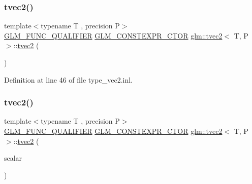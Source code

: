 \mbox{\label{structglm_1_1tvec2_a8874fb6a6421887e236bd3fae0fb44b2}} 
\subsubsection{\texorpdfstring{tvec2()}{tvec2()}\hspace{0.1cm}{\footnotesize\ttfamily [4/17]}}
{\footnotesize\ttfamily template$<$typename T , precision P$>$ \\
\mbox{\hyperlink{setup_8hpp_a33fdea6f91c5f834105f7415e2a64407}{G\+L\+M\+\_\+\+F\+U\+N\+C\+\_\+\+Q\+U\+A\+L\+I\+F\+I\+ER}} \mbox{\hyperlink{setup_8hpp_ad34178a09666081abdb573c14d1f4a5a}{G\+L\+M\+\_\+\+C\+O\+N\+S\+T\+E\+X\+P\+R\+\_\+\+C\+T\+OR}} \mbox{\hyperlink{structglm_1_1tvec2}{glm\+::tvec2}}$<$ T, P $>$\+::\mbox{\hyperlink{structglm_1_1tvec2}{tvec2}} (\begin{DoxyParamCaption}\item[{\mbox{\hyperlink{namespaceglm_a807df837905ec286f806a536af03b57f}{ctor}}}]{ }\end{DoxyParamCaption})\hspace{0.3cm}{\ttfamily [explicit]}}



Definition at line 46 of file type\+\_\+vec2.\+inl.

\mbox{\label{structglm_1_1tvec2_afa741b140588f0be3ceb59ec2b139e34}} 
\subsubsection{\texorpdfstring{tvec2()}{tvec2()}\hspace{0.1cm}{\footnotesize\ttfamily [5/17]}}
{\footnotesize\ttfamily template$<$typename T , precision P$>$ \\
\mbox{\hyperlink{setup_8hpp_a33fdea6f91c5f834105f7415e2a64407}{G\+L\+M\+\_\+\+F\+U\+N\+C\+\_\+\+Q\+U\+A\+L\+I\+F\+I\+ER}} \mbox{\hyperlink{setup_8hpp_ad34178a09666081abdb573c14d1f4a5a}{G\+L\+M\+\_\+\+C\+O\+N\+S\+T\+E\+X\+P\+R\+\_\+\+C\+T\+OR}} \mbox{\hyperlink{structglm_1_1tvec2}{glm\+::tvec2}}$<$ T, P $>$\+::\mbox{\hyperlink{structglm_1_1tvec2}{tvec2}} (\begin{DoxyParamCaption}\item[{T}]{scalar }\end{DoxyParamCaption})\hspace{0.3cm}{\ttfamily [explicit]}}



